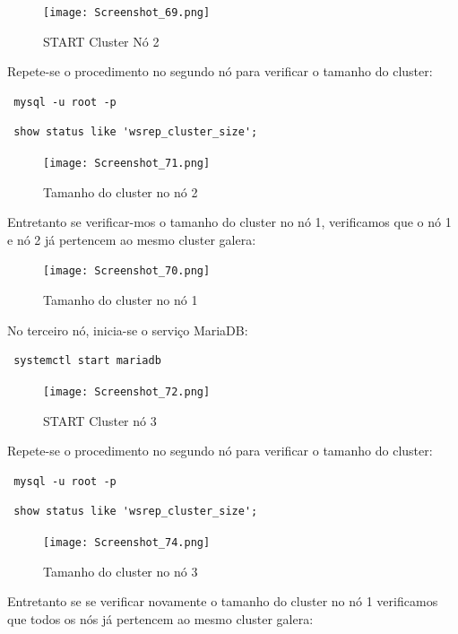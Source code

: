 \begin{figure}[H]
\center
\texttt{[image: Screenshot\_69.png]}
\caption{START Cluster Nó 2}
\end{figure}

Repete-se o procedimento no segundo nó para verificar o tamanho do cluster:

\begin{verbatim} mysql -u root -p \end{verbatim}

\begin{verbatim} show status like 'wsrep_cluster_size'; \end{verbatim}

\begin{figure}[H]
\center
\texttt{[image: Screenshot\_71.png]}
\caption{Tamanho do cluster no nó 2}
\end{figure}

\newpage
Entretanto se verificar-mos o tamanho do cluster no nó 1, verificamos que o nó 1 e nó 2 já pertencem ao mesmo cluster galera:

\begin{figure}[H]
\center
\texttt{[image: Screenshot\_70.png]}
\caption{Tamanho do cluster no nó 1}
\end{figure}

No terceiro nó, inicia-se o serviço MariaDB:

\begin{verbatim} systemctl start mariadb\end{verbatim}

\begin{figure}[H]
\center
\texttt{[image: Screenshot\_72.png]}
\caption{START Cluster nó 3}
\end{figure}

\newpage
Repete-se o procedimento no segundo nó para verificar o tamanho do cluster:

\begin{verbatim} mysql -u root -p \end{verbatim}

\begin{verbatim} show status like 'wsrep_cluster_size'; \end{verbatim}

\begin{figure}[H]
\center
\texttt{[image: Screenshot\_74.png]}
\caption{Tamanho do cluster no nó 3}
\end{figure}

Entretanto se se verificar novamente o tamanho do cluster no nó 1 verificamos que todos os nós já pertencem ao mesmo cluster galera:

